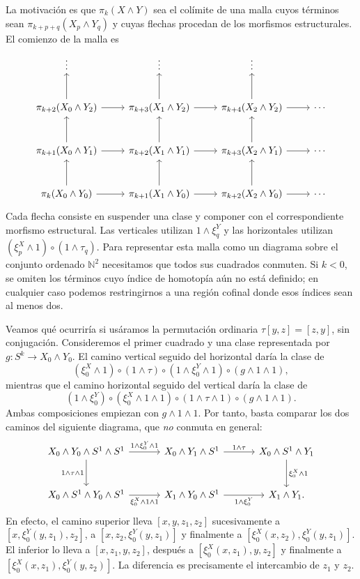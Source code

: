 La motivación es que $\pi_k(X\wedge Y)$ sea el colímite de una malla cuyos términos sean $\pi_{k+p+q}(X_p\wedge Y_q)$ y cuyas flechas procedan de los morfismos estructurales. El comienzo de la malla es
\[
\begin{tikzcd}[row sep=large]
\vdots & \vdots & \vdots\\
\pi_{k+2}(X_0\wedge Y_2) \arrow[u] \arrow[r]
& \pi_{k+3}(X_1\wedge Y_2) \arrow[u] \arrow[r]
& \pi_{k+4}(X_2\wedge Y_2) \arrow[u] \arrow[r] & \cdots\\
\pi_{k+1}(X_0\wedge Y_1) \arrow[u] \arrow[r]
& \pi_{k+2}(X_1\wedge Y_1) \arrow[u] \arrow[r]
& \pi_{k+3}(X_2\wedge Y_1) \arrow[u] \arrow[r] & \cdots\\
\pi_k(X_0\wedge Y_0) \arrow[u] \arrow[r]
& \pi_{k+1}(X_1\wedge Y_0) \arrow[u] \arrow[r]
& \pi_{k+2}(X_2\wedge Y_0) \arrow[u] \arrow[r] & \cdots
\end{tikzcd}
\]
Cada flecha consiste en suspender una clase y componer con el correspondiente morfismo estructural. Las verticales utilizan $1\wedge\xi^Y_q$ y las horizontales utilizan $(\xi^X_p\wedge1)\circ(1\wedge\tau_q)$. Para representar esta malla como un diagrama sobre el conjunto ordenado $\mathbb N^2$ necesitamos que todos sus cuadrados conmuten. Si $k<0$, se omiten los términos cuyo índice de homotopía aún no está definido; en cualquier caso podemos restringirnos a una región cofinal donde esos índices sean al menos dos.

Veamos qué ocurriría si usáramos la permutación ordinaria $\tau[y,z]=[z,y]$, sin conjugación. Consideremos el primer cuadrado y una clase representada por $g\colon S^k\to X_0\wedge Y_0$. El camino vertical seguido del horizontal daría la clase de
\[
(\xi^X_0\wedge1)\circ(1\wedge\tau)
\circ(1\wedge\xi^Y_0\wedge1)\circ(g\wedge1\wedge1),
\]
mientras que el camino horizontal seguido del vertical daría la clase de
\[
(1\wedge\xi^Y_0)\circ(\xi^X_0\wedge1\wedge1)
\circ(1\wedge\tau\wedge1)\circ(g\wedge1\wedge1).
\]
Ambas composiciones empiezan con $g\wedge1\wedge1$. Por tanto, basta comparar los dos caminos del siguiente diagrama, que \emph{no} conmuta en general:
\[
\begin{tikzcd}[column sep=3.2em,row sep=large]
X_0\wedge Y_0\wedge S^1\wedge S^1
\arrow[r,"1\wedge\xi^Y_0\wedge1"] \arrow[d,"1\wedge\tau\wedge1"']
& X_0\wedge Y_1\wedge S^1 \arrow[r,"1\wedge\tau"]
& X_0\wedge S^1\wedge Y_1 \arrow[d,"\xi^X_0\wedge1"]\\
X_0\wedge S^1\wedge Y_0\wedge S^1
\arrow[r,"\xi^X_0\wedge1\wedge1"']
& X_1\wedge Y_0\wedge S^1 \arrow[r,"1\wedge\xi^Y_0"']
& X_1\wedge Y_1.
\end{tikzcd}
\]
En efecto, el camino superior lleva $[x,y,z_1,z_2]$ sucesivamente a $[x,\xi^Y_0(y,z_1),z_2]$, a $[x,z_2,\xi^Y_0(y,z_1)]$ y finalmente a $[\xi^X_0(x,z_2),\xi^Y_0(y,z_1)]$. El inferior lo lleva a $[x,z_1,y,z_2]$, después a $[\xi^X_0(x,z_1),y,z_2]$ y finalmente a $[\xi^X_0(x,z_1),\xi^Y_0(y,z_2)]$. La diferencia es precisamente el intercambio de $z_1$ y $z_2$.

